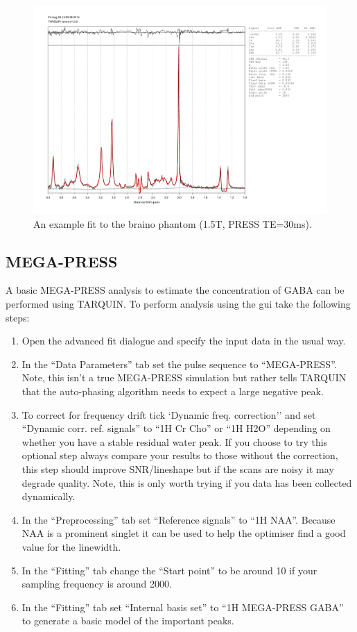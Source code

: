\documentclass[a4paper,12pt]{article}
\begin{document}
\begin{figure}[h!]
\centering
\includegraphics[width=\textwidth]{figs/braino_fit.pdf}
\caption{An example fit to the braino phantom (1.5T, PRESS TE=30ms).}
\label{braino_fit}
\end{figure}


\subsection{MEGA-PRESS}
A basic MEGA-PRESS analysis to estimate the concentration of GABA can be performed using TARQUIN. To perform analysis using the gui take the following steps:

\begin{enumerate}
\item Open the advanced fit dialogue and specify the input data in the usual way.
\item In the ``Data Parameters'' tab set the pulse sequence to ``MEGA-PRESS''. Note, this isn't a true MEGA-PRESS simulation but rather tells TARQUIN that the auto-phasing algorithm needs to expect a large negative peak.
\item To correct for frequency drift tick `Dynamic freq. correction'' and set ``Dynamic corr. ref. signals'' to ``1H Cr Cho'' or ``1H H2O'' depending on whether you have a stable residual water peak. If you choose to try this optional step always compare your results to those without the correction, this step should improve SNR/lineshape but if the scans are noisy it may degrade quality. Note, this is only worth trying if you data has been collected dynamically.
\item In the ``Preprocessing'' tab set ``Reference signals'' to ``1H NAA''. Because NAA is a prominent singlet it can be used to help the optimiser find a good value for the linewidth.
\item In the ``Fitting'' tab change the ``Start point'' to be around 10 if your sampling frequency is around 2000.
\item In the ``Fitting'' tab set ``Internal basis set'' to ``1H MEGA-PRESS GABA'' to generate a basic model of the important peaks.
\end{enumerate}
\end{document}
